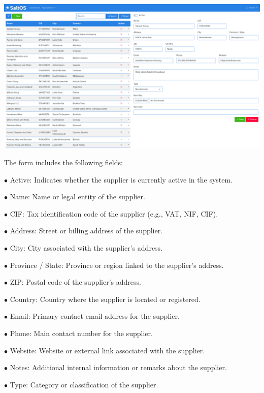 \documentclass[a4paper]{article}
\begin{document}
\begin{center}\includegraphics[width=1\textwidth]{../ujest/snaps/test-screenshots-js-screenshots-purchases-suppliers-edit-100-en-us-1-snap.png}\end{center}

The form includes the following fields:

\begin{compactitem}
\item[\color{myblue}$\bullet$] Active: Indicates whether the supplier is currently active in the system.
\item[\color{myblue}$\bullet$] Name: Name or legal entity of the supplier.
\item[\color{myblue}$\bullet$] CIF: Tax identification code of the supplier (e.g., VAT, NIF, CIF).
\item[\color{myblue}$\bullet$] Address: Street or billing address of the supplier.
\item[\color{myblue}$\bullet$] City: City associated with the supplier's address.
\item[\color{myblue}$\bullet$] Province / State: Province or region linked to the supplier's address.
\item[\color{myblue}$\bullet$] ZIP: Postal code of the supplier's address.
\item[\color{myblue}$\bullet$] Country: Country where the supplier is located or registered.
\item[\color{myblue}$\bullet$] Email: Primary contact email address for the supplier.
\item[\color{myblue}$\bullet$] Phone: Main contact number for the supplier.
\item[\color{myblue}$\bullet$] Website: Website or external link associated with the supplier.
\item[\color{myblue}$\bullet$] Notes: Additional internal information or remarks about the supplier.
\item[\color{myblue}$\bullet$] Type: Category or classification of the supplier.
\end{compactitem}
\end{document}
